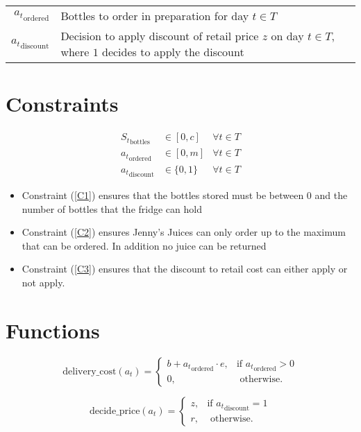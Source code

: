 \documentclass[a4paper]{article}
\newcommand{\SET}[1]{\{ {#1} \}}
\begin{document}
\begin{tabular}{rl}
${a_t}_{\text{ordered}}$ & Bottles to order in preparation for day $t \in T$\\
${a_t}_{\text{discount}}$ & Decision to apply discount of retail price $z$ on day $t \in T$, where $1$ decides to apply the discount
\end{tabular}

\section*{Constraints}

\begin{align}
{S_t}_{\text{bottles}} & \in [0, c]   & \forall t \in T \label{C1}\\
{a_t}_{\text{ordered}} & \in [0, m]   & \forall t \in T \label{C2}\\
{a_t}_{\text{discount}} & \in \SET{0, 1}   & \forall t \in T \label{C3}
\end{align}

\begin{itemize}
    \item Constraint (\ref{C1}) ensures that the bottles stored must be between 0 and the number of bottles that the fridge can hold 
    \item Constraint (\ref{C2}) ensures Jenny's Juices can only order up to the maximum that can be ordered. In addition no juice can be returned
    \item Constraint (\ref{C3}) ensures that the discount to retail cost can either apply or not apply.
\end{itemize}


\section*{Functions}

\[
\text{delivery\_cost}(a_t) = \begin{cases}
        b + {a_t}_{\text{ordered}} \cdot e, &\mbox{if } {a_t}_{\text{ordered}} > 0\\
        0, &\mbox{ otherwise.} 
    \end{cases} 
    \label{(C1)}
\]

\[
\text{decide\_price}(a_t) = \begin{cases}
        z, &\mbox{if } {a_t}_{\text{discount}} = 1\\
        r, &\mbox{ otherwise.} 
    \end{cases} 
\]
\end{document}

